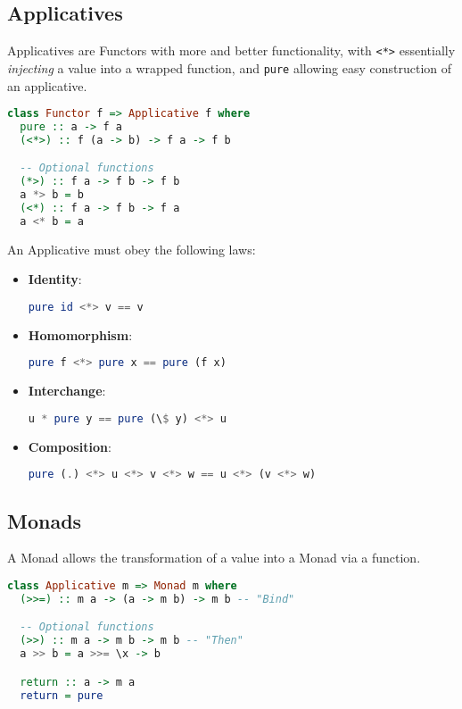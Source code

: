 \subsection{Applicatives}
Applicatives are Functors with more and better functionality, with \texttt{<*>} essentially \textit{injecting} a value into a wrapped function, and \texttt{pure} allowing easy construction of an applicative.

\begin{lstlisting}[language=haskell]
class Functor f => Applicative f where
  pure :: a -> f a
  (<*>) :: f (a -> b) -> f a -> f b

  -- Optional functions
  (*>) :: f a -> f b -> f b
  a *> b = b
  (<*) :: f a -> f b -> f a
  a <* b = a
\end{lstlisting}

An Applicative must obey the following laws:
\begin{itemize}
  \item \textbf{Identity}: \begin{lstlisting}[language=haskell]
pure id <*> v == v\end{lstlisting}
  \item \textbf{Homomorphism}: \begin{lstlisting}[language=haskell]
pure f <*> pure x == pure (f x)\end{lstlisting}
  \item \textbf{Interchange}: \begin{lstlisting}[language=haskell]
u * pure y == pure (\$ y) <*> u\end{lstlisting}
  \item \textbf{Composition}: \begin{lstlisting}[language=haskell]
pure (.) <*> u <*> v <*> w == u <*> (v <*> w)\end{lstlisting}
\end{itemize}

\subsection{Monads}
A Monad allows the transformation of a value into a Monad via a function.

\begin{lstlisting}[language=haskell]
class Applicative m => Monad m where
  (>>=) :: m a -> (a -> m b) -> m b -- "Bind"

  -- Optional functions
  (>>) :: m a -> m b -> m b -- "Then"
  a >> b = a >>= \x -> b

  return :: a -> m a
  return = pure
\end{lstlisting}

